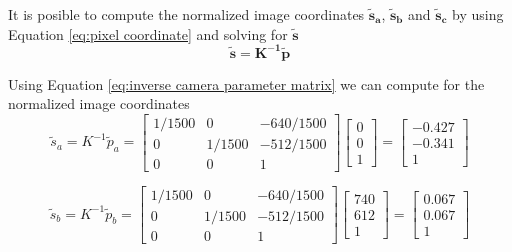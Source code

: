 \documentclass[12pt, letterpaper]{article}
\begin{document}
\begin{enumerate}
        It is posible to compute the normalized image coordinates
        $\bm{\tilde{s}_a}$, $\bm{\tilde{s}_b}$ and $\bm{\tilde{s}_c}$ by using
        Equation \eqref{eq:pixel coordinate} and solving for $\bm{\tilde{s}}$
        \begin{equation*}
            \bm{\tilde{s}=K^{-1}\tilde{p}}
        \end{equation*}
        
        Using Equation \eqref{eq:inverse camera parameter matrix} we can compute 
        for the normalized image coordinates
        \begin{equation*}
            \tilde{s}_a=K^{-1}\tilde{p}_a=\begin{bmatrix}
                1/1500 & 0 & -640/1500\\
                0 & 1/1500 & -512/1500\\
                0 & 0 & 1
            \end{bmatrix}
            \begin{bmatrix}
                0\\
                0\\
                1
            \end{bmatrix}=\begin{bmatrix}
                -0.427\\
                -0.341\\
                1
            \end{bmatrix}
        \end{equation*}

        \begin{equation*}
            \tilde{s}_b=K^{-1}\tilde{p}_b=\begin{bmatrix}
                1/1500 & 0 & -640/1500\\
                0 & 1/1500 & -512/1500\\
                0 & 0 & 1
            \end{bmatrix}
            \begin{bmatrix}
                740\\
                612\\
                1
            \end{bmatrix}=\begin{bmatrix}
                0.067\\
                0.067\\
                1
            \end{bmatrix}
        \end{equation*}


\end{enumerate}
\end{document}
